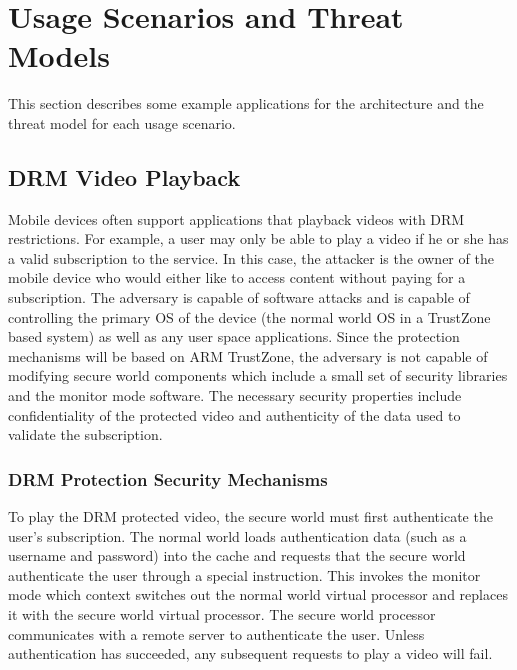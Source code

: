 \section{Usage Scenarios and Threat Models}
    This section describes some example applications for the architecture and 
    the threat model for each usage scenario.

    \subsection{DRM Video Playback}
    Mobile devices often support applications that playback videos with
    DRM restrictions. For example, a user may only be able to play a video if 
    he or she has a valid subscription to the service. In this case, the 
    attacker is the owner of the mobile device who would either like to access 
    content without paying for a subscription. The adversary is capable of
    software attacks and is capable of controlling the primary OS of the device 
    (the normal world OS in a TrustZone based system) as well as any user space 
    applications. Since the protection mechanisms will be based on ARM 
    TrustZone, the adversary is not capable of modifying secure world 
    components which include a small set of security libraries and the monitor 
    mode software. The necessary security properties include confidentiality of 
    the protected video and authenticity of the data used to validate the 
    subscription.

    \subsubsection{DRM Protection Security Mechanisms}
    
    To play the DRM protected video, the secure world must first authenticate 
    the user's subscription. The normal world loads authentication data (such 
    as a username and password) into the cache and requests that the secure 
    world authenticate the user through a special instruction. This invokes the 
    monitor mode which context switches out the normal world virtual processor 
    and replaces it with the secure world virtual processor. The secure world 
    processor communicates with a remote server to authenticate the user.  
    Unless authentication has succeeded, any subsequent requests to play a 
    video will fail.

